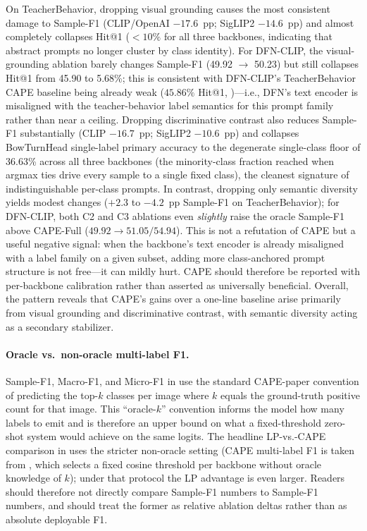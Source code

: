 \documentclass[electronics,article,submit,pdftex,moreauthors]{Definitions/mdpi}
\begin{document}
On TeacherBehavior, dropping visual grounding causes the most consistent damage to Sample-F1 (CLIP/OpenAI $-17.6$~pp; SigLIP2 $-14.6$~pp) and almost completely collapses Hit@1 ($<10\%$ for all three backbones, indicating that abstract prompts no longer cluster by class identity). For DFN-CLIP, the visual-grounding ablation barely changes Sample-F1 (49.92 $\to$ 50.23) but still collapses Hit@1 from 45.90 to 5.68\%; this is consistent with DFN-CLIP's TeacherBehavior CAPE baseline being already weak ($45.86\%$ Hit@1, )---i.e., DFN's text encoder is misaligned with the teacher-behavior label semantics for this prompt family rather than near a ceiling. Dropping discriminative contrast also reduces Sample-F1 substantially (CLIP $-16.7$~pp; SigLIP2 $-10.6$~pp) and collapses BowTurnHead single-label primary accuracy to the degenerate single-class floor of 36.63\% across all three backbones (the minority-class fraction reached when argmax ties drive every sample to a single fixed class), the cleanest signature of indistinguishable per-class prompts. In contrast, dropping only semantic diversity yields modest changes ($+2.3$ to $-4.2$~pp Sample-F1 on TeacherBehavior); for DFN-CLIP, both \textsc{C2} and \textsc{C3} ablations even \emph{slightly} raise the oracle Sample-F1 above CAPE-Full ($49.92 \to 51.05 / 54.94$). This is not a refutation of CAPE but a useful negative signal: when the backbone's text encoder is already misaligned with a label family on a given subset, adding more class-anchored prompt structure is not free---it can mildly hurt. CAPE should therefore be reported with per-backbone calibration rather than asserted as universally beneficial. Overall, the pattern reveals that CAPE's gains over a one-line baseline arise primarily from visual grounding and discriminative contrast, with semantic diversity acting as a secondary stabilizer.

\paragraph{Oracle vs.\ non-oracle multi-label F1.} Sample-F1, Macro-F1, and Micro-F1 in  use the standard CAPE-paper convention of predicting the top-$k$ classes per image where $k$ equals the ground-truth positive count for that image. This ``oracle-$k$'' convention informs the model how many labels to emit and is therefore an upper bound on what a fixed-threshold zero-shot system would achieve on the same logits. The headline LP-vs.-CAPE comparison in  uses the stricter non-oracle setting (CAPE multi-label F1 is taken from , which selects a fixed cosine threshold per backbone without oracle knowledge of $k$); under that protocol the LP advantage is even larger. Readers should therefore not directly compare  Sample-F1 numbers to  Sample-F1 numbers, and should treat the former as relative ablation deltas rather than as absolute deployable F1.
\end{document}
